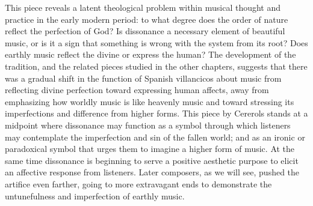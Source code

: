 
This piece reveals a latent theological problem within musical thought and
practice in the early modern period: to what degree does the order of nature
reflect the perfection of God?
Is dissonance a necessary element of beautiful music, or is it a sign that
something is wrong with the system from its root?  
Does earthly music reflect the divine or express the human?
The development of the  tradition, and the related
pieces studied in the other chapters, suggests that there was a gradual shift in
the function of Spanish villancicos about music from reflecting divine
perfection toward expressing human affects, away from emphasizing how worldly
music is like heavenly music and toward stressing its imperfections and
difference from higher forms.
This piece by Cererols stands at a midpoint where dissonance may function as a
symbol through which listeners may contemplate the imperfection and sin of the
fallen world; and as an ironic or paradoxical symbol that urges them to imagine
a higher form of music. 
At the same time dissonance is beginning to serve a positive aesthetic purpose
to elicit an affective response from listeners.
Later composers, as we will see, pushed the artifice even farther, going to
more extravagant ends to demonstrate the untunefulness and imperfection of
earthly music.


